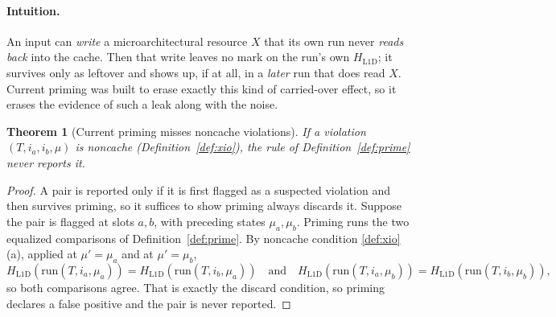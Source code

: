 \documentclass[11pt]{article}
\theoremstyle{definition}
\theoremstyle{plain}
\newtheorem{theorem}{Theorem}
\newcommand{\run}{\mathrm{run}}
\newcommand{\HL}{H_{\mathrm{L1D}}}
\begin{document}
\paragraph{Intuition.}
An input can \emph{write} a microarchitectural resource $X$ that its own run never
\emph{reads back} into the cache. Then that write leaves no mark on the run's own
$\HL$; it survives only as leftover and shows up, if at all, in a \emph{later} run that
does read $X$. Current priming was built to erase exactly this kind of carried-over
effect, so it erases the evidence of such a leak along with the noise.

\begin{center}
\end{center}

\begin{theorem}[Current priming misses noncache violations]
\label{thm:miss}
If a violation $(T,i_a,i_b,\mu)$ is noncache (Definition~\ref{def:xio}), the rule of
Definition~\ref{def:prime} never reports it.
\end{theorem}

\begin{proof}
A pair is reported only if it is first flagged as a suspected violation and then
survives priming, so it suffices to show priming always discards it. Suppose the pair
is flagged at slots $a,b$, with preceding states $\mu_a,\mu_b$. Priming runs the two
equalized comparisons of Definition~\ref{def:prime}. By noncache condition
\ref{def:xio}(a), applied at $\mu'=\mu_a$ and at $\mu'=\mu_b$,
\[
  \HL(\run(T,i_a,\mu_a))=\HL(\run(T,i_b,\mu_a))
  \quad\text{and}\quad
  \HL(\run(T,i_a,\mu_b))=\HL(\run(T,i_b,\mu_b)),
\]
so both comparisons agree. That is exactly the discard condition, so priming declares a
false positive and the pair is never reported.
\end{proof}
\end{document}
